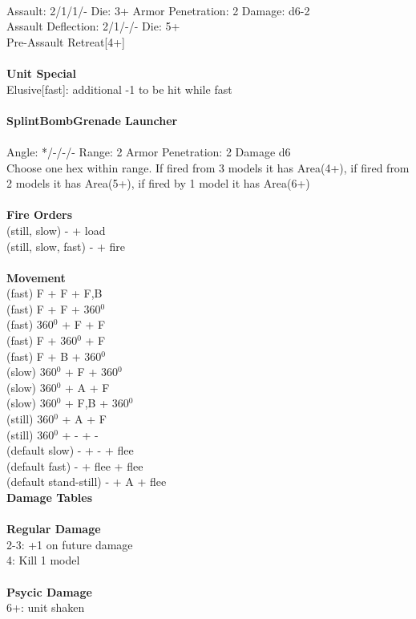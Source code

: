 \ \\
Assault: 2/1/1/- Die: 3+ Armor Penetration: 2 Damage: d6-2 \\
Assault Deflection: 2/1/-/- Die: 5+\\
\indent Pre-Assault Retreat[4+] \\
\ \\

{\bf Unit Special} \\
Elusive[fast]: additional -1 to be hit while fast
\ \\
\ \\
{\bf SplintBombGrenade Launcher } \\
\ \\
Angle: */-/-/- Range: 2 Armor Penetration: 2 Damage d6 \\
\indent Choose one hex within range. If fired from 3 models it has Area(4+), if fired from 2 models it has Area(5+), if fired by 1 model it has Area(6+) \\





\ \\ {\bf Fire Orders } \\
(still, slow) - + load \\
(still, slow, fast) - + fire \\
\ \\ {\bf Movement } \\
(fast) F + F + F,B  \\
(fast) F + F + 360$^0$ \\
(fast) 360$^0$ + F + F \\
(fast) F + 360$^0$ + F \\
(fast) F + B + 360$^0$ \\
(slow) 360$^0$ + F + 360$^0$ \\
(slow) 360$^0$ + A + F \\
(slow) 360$^0$ + F,B + 360$^0$ \\
(still) 360$^0$ + A + F \\
(still) 360$^0$ + - + -  \\
(default slow) - + - + flee \\
(default fast) - + flee + flee \\
(default stand-still) - + A + flee \\



{\bf Damage Tables} \\
\ \\ {\bf Regular Damage } \\
2-3: +1 on future damage \\
4: Kill 1 model \\
\ \\ {\bf Psycic Damage } \\
6+: unit shaken \\



